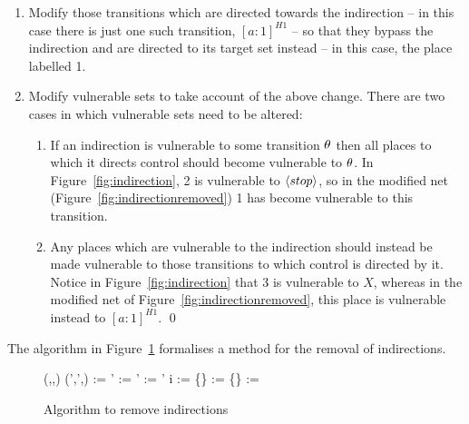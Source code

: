 \begin{exampleb}
\begin{enumerate}
\item Modify those transitions which are directed towards
the indirection -- in this case there is just one such transition,
$[a:1]^{H1}$ -- so that they bypass the indirection and are directed 
to its target set instead -- in this case, the place labelled 1.
\item Modify vulnerable sets to take account of the above change. There are
two cases in which vulnerable sets need to be altered:
\begin{enumerate}
\item If an indirection is vulnerable to some transition $\theta$ then all 
places to which it directs control should become vulnerable to $\theta$. In
Figure~\ref{fig:indirection}, 2 is vulnerable to ${\langle stop\rangle}$, 
so in the modified net (Figure~\ref{fig:indirectionremoved}) 1 has become 
vulnerable to this transition.
\item Any places which are vulnerable to the indirection should instead
be made vulnerable to those transitions to which control is directed
by it. Notice in Figure~\ref{fig:indirection} that 3 is vulnerable to
$X$, whereas in the modified net of
Figure~\ref{fig:indirectionremoved}, this place is vulnerable instead
to $[a:1]^{H1}$.
\qed 
\end{enumerate} 
\end{enumerate}
\end{exampleb}
The algorithm in Figure~\ref{fig:removeindirections} formalises a method
for the removal of indirections. 
\begin{figure}
\begin{center}
\small
\NumberProgramstrue
\begin{programbox}
\INPUT
{} (\W,\T,\WI)   
\ENDINPUT
\OUTPUT
{} (\W',\T',\WI) 
\ENDOUTPUT
\BEGIN
\I := 
\W' := \W \setminus {}
\T' := \T \setminus \I 
\FOREACH \tr \in \T' \DO
\FOREACH i \in \I \DO
\IF {} \in \postset{\tr} \THEN \postset{\tr} := \postset{\tr} \setminus \{\} \cup {} \FI
\IF {} \in \vset{\tr} \THEN \vset{\tr} := \vset{\tr} \setminus \{\} \cup {} \FI
\IF \preset{\tr} \in {} \THEN \vset{\tr} := \vset{\tr} \cup {} \FI 
\OD
\OD
\END
\end{programbox}
\end{center}
\caption{Algorithm to remove indirections \label{fig:removeindirections}}
\end{figure}
